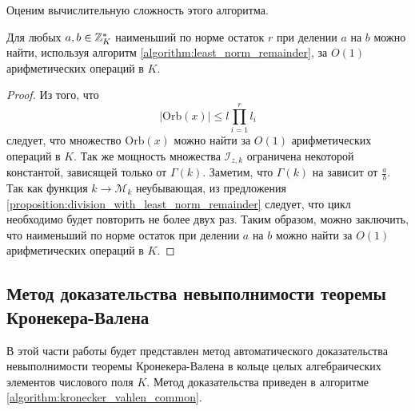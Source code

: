 \documentclass[_00_dissertation.tex]{subfiles}
\begin{document}
Оценим вычислительную сложность этого алгоритма.

\begin{proposition}
    Для любых $a, b \in \mathbb{Z}_K^{*}$ наименьший по норме остаток $r$ при делении $a$ на $b$ можно найти, используя алгоритм \ref{algorithm:least_norm_remainder}, за $O(1)$ арифметических операций в $K$.
\end{proposition}
\begin{proof}
    Из того, что
    \begin{equation*}
        |\textrm{Orb}(x)| \le l\prod\limits_{i=1}^r l_i
    \end{equation*}
    следует, что множество $\textrm{Orb}(x)$ можно найти за $O(1)$ арифметических операций в $K$.
    Так же мощность множества $\mathcal{I}_{z, k}$ ограничена некоторой константой, зависящей только от $\Gamma(k)$.
    Заметим, что $\Gamma(k)$ на зависит от $\frac{a}{b}$.
    Так как функция $k \to \mathcal{M}_k$ неубывающая, из предложения \ref{proposition:division_with_least_norm_remainder} следует, что цикл необходимо будет повторить не более двух раз.
    Таким образом, можно заключить, что наименьший по норме остаток при делении $a$ на $b$ можно найти за $O(1)$ арифметических операций в $K$.
\end{proof}

\subsection{Метод доказательства невыполнимости теоремы Кронекера-Валена}

В этой части работы будет представлен метод автоматического доказательства невыполнимости теоремы Кронекера-Валена в кольце целых алгебраических элементов числового поля $K$.
Метод доказательства приведен в алгоритме \ref{algorithm:kronecker_vahlen_common}.
\end{document}
